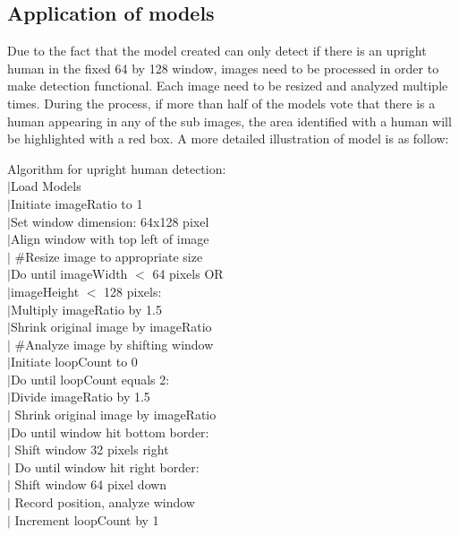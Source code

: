 \documentclass[twocolumn, 12pt]{article}
\begin{document}
\subsection{Application of models}
Due to the fact that the model created can only detect if there is an upright human in the fixed 64 by 128 window, images need to be processed in order to make detection functional. Each image need to be resized and analyzed multiple times. During the process, if more than half of the models vote that there is a human appearing in any of the sub images, the area identified with a human will be highlighted with a red box. A more detailed illustration of model is as follow:
{\selectfont\small
\begin{tabbing}
Algorithm for upright human detection:\\
$| $Load Models\\
$| $Initiate imageRatio to 1\\
$| $Set window dimension: 64x128 pixel\\
$| $Align window with top left of image\\
$| $  \#Resize image to appropriate size\\
$| $Do until imageWidth $<$ 64 pixels OR\\
$| $imageHeight $<$ 128 pixels: \\
$| $\quad Multiply imageRatio by 1.5\\
$| $\quad Shrink original image by imageRatio\\
$| $  \#Analyze image by shifting window\\
$| $Initiate loopCount to 0\\
$| $Do until loopCount equals 2: \\
$| $\quad Divide imageRatio by 1.5\\
$| $ \quad Shrink original image by imageRatio\\
$| $\quad Do until window hit bottom border:\\
$| $ \quad \quad Shift window 32 pixels right\\
$| $ \quad \quad Do until window hit right border:\\
$| $ \quad \quad \quad Shift window 64 pixel down\\
$| $ \quad \quad \quad Record position, analyze window\\
$| $ \quad Increment loopCount by 1\
\end{tabbing}}
\end{document}
